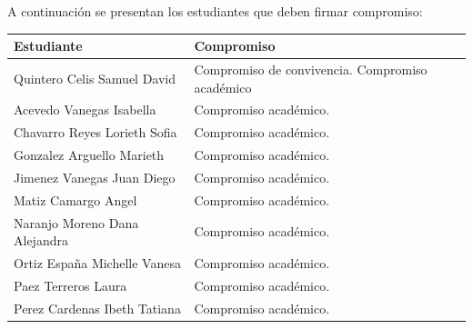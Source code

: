 \documentclass[spanish,11pt,a4paper]{article}
\begin{document}
	\begin{flushleft}
		A continuación se presentan los estudiantes que deben firmar compromiso:\\
	\end{flushleft}
	\vspace{0.5cm}
	\begin{longtable}{|p{6cm}|p{5cm}|}
		\hline
		\textbf{Estudiante} & \textbf{Compromiso} \\
		\hline\hline
		
		
		Quintero Celis Samuel David & Compromiso de convivencia.
		Compromiso académico  \\
		\hline
		
		Acevedo Vanegas Isabella & Compromiso académico.  \\
		\hline
		
		Chavarro Reyes Lorieth Sofia & Compromiso académico.  \\
		\hline
		
		Gonzalez Arguello Marieth & Compromiso académico.\\
		\hline
		
		Jimenez Vanegas Juan Diego & Compromiso académico.\\
		\hline
		
		Matiz Camargo Angel & Compromiso académico.\\
		\hline
		
		Naranjo Moreno Dana Alejandra & Compromiso académico. \\
		\hline
		
		Ortiz España Michelle Vanesa & Compromiso académico.\\
		\hline
		
		Paez Terreros Laura & Compromiso académico.\\
		\hline
		
		Perez Cardenas Ibeth Tatiana & Compromiso académico.\\
		\hline
		
		
		
		
		
	\end{longtable}
	
	
\end{document}
